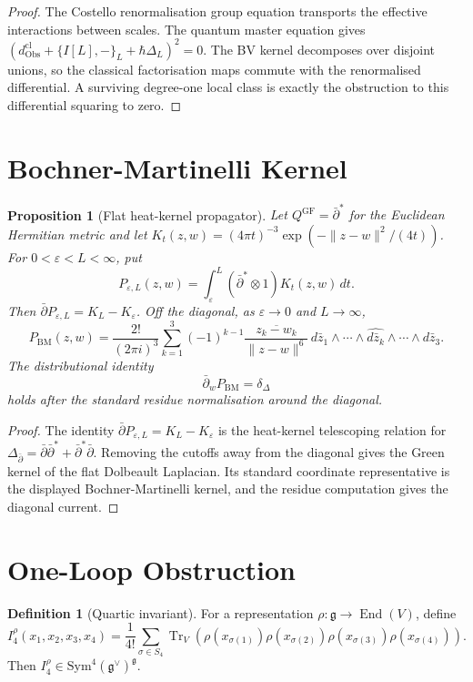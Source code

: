 \documentclass[11pt]{amsart}
\providecommand{\hb}{\hbar}
\providecommand{\dbar}{\bar{\partial}}
\providecommand{\dbarstar}{\bar{\partial}^{\ast}}
\providecommand{\g}{\mathfrak{g}}
\providecommand{\Tr}{\operatorname{Tr}}
\providecommand{\End}{\operatorname{End}}
\providecommand{\Obs}{\mathrm{Obs}}
\providecommand{\Sym}{\mathrm{Sym}}
\theoremstyle{plain}
\newtheorem{proposition}[theorem]{Proposition}
\theoremstyle{definition}
\newtheorem{definition}[theorem]{Definition}
\theoremstyle{remark}
\begin{document}
\begin{proof}
The Costello renormalisation group equation transports the effective
interactions between scales. The quantum master equation gives
\((d_{\Obs}^{\mathrm{cl}}+\{I[L],-\}_L+\hb\Delta_L)^2=0\). The BV
kernel decomposes over disjoint unions, so the classical factorisation
maps commute with the renormalised differential. A surviving
degree-one local class is exactly the obstruction to this differential
squaring to zero.
\end{proof}

\section{Bochner-Martinelli Kernel}

\begin{proposition}[Flat heat-kernel propagator]\label{prop:e2-bm-kernel}
Let \(Q^{\mathrm{GF}}=\dbarstar\) for the Euclidean Hermitian metric and
let \(K_t(z,w)=(4\pi t)^{-3}\exp(-\|z-w\|^2/(4t))\). For
\(0<\varepsilon<L<\infty\), put
\[
 P_{\varepsilon,L}(z,w)
 =
 \int_\varepsilon^L(\dbarstar\otimes1)K_t(z,w)\,dt .
\]
Then \(\dbar P_{\varepsilon,L}=K_L-K_\varepsilon\). Off the diagonal,
as \(\varepsilon\to0\) and \(L\to\infty\),
\[
 P_{\mathrm{BM}}(z,w)
 =
 \frac{2!}{(2\pi i)^3}\sum_{k=1}^3
 (-1)^{k-1}\frac{\overline{z_k-w_k}}{\|z-w\|^6}\,
 d\bar z_1\wedge\cdots\wedge\widehat{d\bar z_k}
 \wedge\cdots\wedge d\bar z_3 .
\]
The distributional identity
\[
 \dbar_w P_{\mathrm{BM}}=\delta_\Delta
\]
holds after the standard residue normalisation around the diagonal.
\end{proposition}

\begin{proof}
The identity \(\dbar P_{\varepsilon,L}=K_L-K_\varepsilon\) is the
heat-kernel telescoping relation for
\(\Delta_{\dbar}=\dbar\dbarstar+\dbarstar\dbar\). Removing the cutoffs
away from the diagonal gives the Green kernel of the flat Dolbeault
Laplacian. Its standard coordinate representative is the displayed
Bochner-Martinelli kernel, and the residue computation gives the
diagonal current.
\end{proof}

\section{One-Loop Obstruction}

\begin{definition}[Quartic invariant]\label{def:e2-quartic-invariant}
For a representation \(\rho:\g\to\End(V)\), define
\[
 I_4^\rho(x_1,x_2,x_3,x_4)
 =
 \frac1{4!}\sum_{\sigma\in S_4}
 \Tr_V\!\left(
  \rho(x_{\sigma(1)})\rho(x_{\sigma(2)})
  \rho(x_{\sigma(3)})\rho(x_{\sigma(4)})
 \right).
\]
Then \(I_4^\rho\in\Sym^4(\g^\vee)^\g\).
\end{definition}
\end{document}
